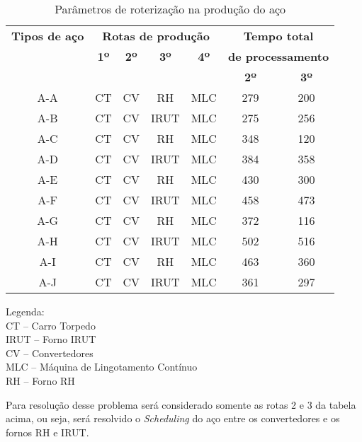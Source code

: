 \begin{table}[htbp]
\begin{center}
\begin{tabular}{|c|c|c|c|c|c|c|}
\hline
\multicolumn{ 1}{|c|}{\textbf{Tipos de aço}} & \multicolumn{ 4}{c|}{\textbf{Rotas de produção}} & \multicolumn{ 2}{c|}{\textbf{Tempo total }} \\ \cline{ 2- 7}
\multicolumn{ 1}{|c|}{} & \multicolumn{ 1}{c|}{\textbf{1º}} & \multicolumn{ 1}{c|}{\textbf{2º}} & \multicolumn{ 1}{c|}{\textbf{3º}} & \multicolumn{ 1}{c|}{\textbf{4º}} & \multicolumn{ 2}{c|}{\textbf{de processamento }} \\ \cline{ 6- 7}
\multicolumn{ 1}{|c|}{} & \multicolumn{ 1}{c|}{} & \multicolumn{ 1}{c|}{} & \multicolumn{ 1}{c|}{} & \multicolumn{ 1}{c|}{} & \textbf{2º} & \textbf{3º} \\ \hline
A-A & CT & CV & RH & MLC & 279 & 200 \\ \hline
A-B & CT & CV & IRUT & MLC & 275 & 256 \\ \hline
A-C & CT & CV & RH & MLC & 348 & 120 \\ \hline
A-D & CT & CV & IRUT & MLC & 384 & 358 \\ \hline
A-E & CT & CV & RH & MLC & 430 & 300 \\ \hline
A-F & CT & CV & IRUT & MLC & 458 & 473 \\ \hline
A-G & CT & CV & RH & MLC & 372 & 116 \\ \hline
A-H & CT & CV & IRUT & MLC & 502 & 516 \\ \hline
A-I & CT & CV & RH & MLC & 463 & 360 \\ \hline
A-J & CT & CV & IRUT & MLC & 361 & 297 \\ \hline
\end{tabular}
\end{center}
\caption{Parâmetros de roterização na produção do aço}
\label{desc_rota}
\end{table}
Legenda:\\
CT – Carro Torpedo \\
IRUT – Forno IRUT \\				
CV – Convertedores \\		
MLC – Máquina de Lingotamento Contínuo \\				
RH – Forno RH						

Para resolução desse problema será considerado somente as rotas 2 e 3 da tabela acima, ou seja, será resolvido o {\it Scheduling} do aço entre os convertedores e os fornos RH e IRUT.







